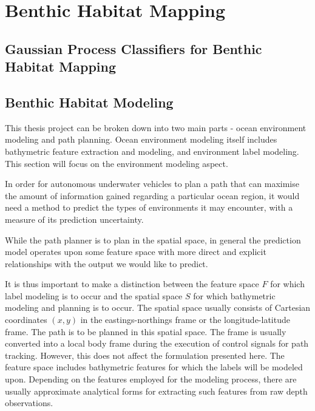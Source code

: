 \chapter{Benthic Habitat Mapping}
\label{Benthic-Habitat-Mapping}
			
	\section{Gaussian Process Classifiers for Benthic Habitat Mapping}
	
	\section{Benthic Habitat Modeling}
	\label{ModelingOceanEnvironment:ModelingFeatures}
	
		This thesis project can be broken down into two main parts - ocean environment modeling and path planning. Ocean environment modeling itself includes bathymetric feature extraction and modeling, and environment label modeling. This section will focus on the environment modeling aspect.
			
		In order for autonomous underwater vehicles to plan a path that can maximise the amount of information gained regarding a particular ocean region, it would need a method to predict the types of environments it may encounter, with a measure of its prediction uncertainty.
		
		While the path planner is to plan in the spatial space, in general the prediction model operates upon some feature space with more direct and explicit relationships with the output we would like to predict.
		
		It is thus important to make a distinction between the feature space $F$ for which label modeling is to occur and the spatial space $S$ for which bathymetric modeling and planning is to occur. The spatial space usually consists of Cartesian coordinates $(x, y)$ in the eastings-northings frame or the longitude-latitude frame. The path is to be planned in this spatial space. The frame is usually converted into a local body frame during the execution of control signals for path tracking. However, this does not affect the formulation presented here. The feature space includes bathymetric features for which the labels will be modeled upon. Depending on the features employed for the modeling process, there are usually approximate analytical forms for extracting such features from raw depth observations.

